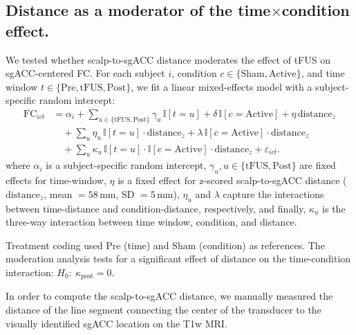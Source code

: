 \subsection*{Distance as a moderator of the time$\times$condition effect.}
\noindent
We tested whether scalp-to-sgACC distance moderates the effect of tFUS on sgACC-centered FC. For each subject $i$, condition $c\in\{\mathrm{Sham},\mathrm{Active}\}$, and time window $t\in\{\mathrm{Pre},\mathrm{tFUS},\mathrm{Post}\}$, we fit a linear mixed-effects model with a subject-specific random intercept:
\begin{equation}
\label{eq:distance_mixed}
\begin{aligned}
\mathrm{FC}_{ict} &=
\alpha_i
+ \sum_{u\in\{\mathrm{tFUS},\mathrm{Post}\}}\gamma_u\,\mathbb{I}[t=u]
+ \delta\,\mathbb{I}[c=\mathrm{Active}]
+ \eta\,\mathrm{distance}_z \\
&\quad
+ \sum_{u}\eta_u\,\mathbb{I}[t=u]\cdot \mathrm{distance}_z
+ \lambda\,\mathbb{I}[c=\mathrm{Active}]\cdot \mathrm{distance}_z\\
&\quad
+ \sum_{u}\kappa_u\,\mathbb{I}[t=u]\cdot \mathbb{I}[c=\mathrm{Active}]\cdot \mathrm{distance}_z
+ \varepsilon_{ict}.
\end{aligned}
\end{equation}
where $\alpha_i$ is a subject-specific random intercept, $\gamma_u, u\in\{\mathrm{tFUS},\mathrm{Post}\}$ are fixed effects for time-window, $\eta$ is a fixed effect for z-scored scalp-to-sgACC distance ($\mathrm{distance}_z$, mean $=58$\,mm, SD $=5$\,mm), $\eta_u$ and $\lambda$ capture the interactions between time-distance and condition-distance, respectively, and finally, $\kappa_u$ is the three-way interaction between time window, condition, and distance. 

Treatment coding used $\mathrm{Pre}$ (time) and $\mathrm{Sham}$ (condition) as references. The moderation analysis tests for a significant effect of distance on the time-condition interaction: $H_0\!:\ \kappa_{\mathrm{post}}=0$. 

In order to compute the scalp-to-sgACC distance, we manually measured the distance of the line segment connecting the center of the transducer to the visually identified sgACC location on the T1w MRI.

